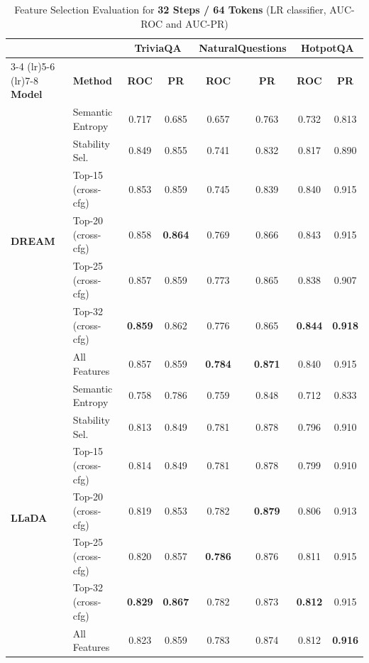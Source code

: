 \documentclass{article}
\begin{document}
\begin{table}[htbp]
\centering
\small
\caption{Feature Selection Evaluation for \textbf{32 Steps / 64 Tokens} (LR classifier, AUC-ROC and AUC-PR)}
\label{tab:fs_32steps_64tokens}
\begin{tabular}{llcccccc}
\toprule
 & & \multicolumn{2}{c}{\textbf{TriviaQA}} & \multicolumn{2}{c}{\textbf{NaturalQuestions}} & \multicolumn{2}{c}{\textbf{HotpotQA}} \\
\cmidrule(lr){3-4} \cmidrule(lr){5-6} \cmidrule(lr){7-8}
\textbf{Model} & \textbf{Method} & \textbf{ROC} & \textbf{PR} & \textbf{ROC} & \textbf{PR} & \textbf{ROC} & \textbf{PR} \\
\midrule
\multirow{7}{*}{\textbf{DREAM}}
 & Semantic Entropy & 0.717 & 0.685 & 0.657 & 0.763 & 0.732 & 0.813 \\
 \cmidrule(lr){2-8}
 & Stability Sel. & 0.849 & 0.855 & 0.741 & 0.832 & 0.817 & 0.890 \\
 & Top-15 (cross-cfg) & 0.853 & 0.859 & 0.745 & 0.839 & 0.840 & 0.915 \\
 & Top-20 (cross-cfg) & 0.858 & \textbf{0.864} & 0.769 & 0.866 & 0.843 & 0.915 \\
 & Top-25 (cross-cfg) & 0.857 & 0.859 & 0.773 & 0.865 & 0.838 & 0.907 \\
 & Top-32 (cross-cfg) & \textbf{0.859} & 0.862 & 0.776 & 0.865 & \textbf{0.844} & \textbf{0.918} \\
 & All Features & 0.857 & 0.859 & \textbf{0.784} & \textbf{0.871} & 0.840 & 0.915 \\
\midrule
\multirow{7}{*}{\textbf{LLaDA}}
 & Semantic Entropy & 0.758 & 0.786 & 0.759 & 0.848 & 0.712 & 0.833 \\
 \cmidrule(lr){2-8}
 & Stability Sel. & 0.813 & 0.849 & 0.781 & 0.878 & 0.796 & 0.910 \\
 & Top-15 (cross-cfg) & 0.814 & 0.849 & 0.781 & 0.878 & 0.799 & 0.910 \\
 & Top-20 (cross-cfg) & 0.819 & 0.853 & 0.782 & \textbf{0.879} & 0.806 & 0.913 \\
 & Top-25 (cross-cfg) & 0.820 & 0.857 & \textbf{0.786} & 0.876 & 0.811 & 0.915 \\
 & Top-32 (cross-cfg) & \textbf{0.829} & \textbf{0.867} & 0.782 & 0.873 & \textbf{0.812} & 0.915 \\
 & All Features & 0.823 & 0.859 & 0.783 & 0.874 & 0.812 & \textbf{0.916} \\
\bottomrule
\end{tabular}
\end{table}
\newpage
\end{document}
